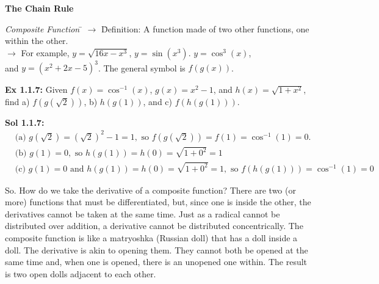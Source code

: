\bigskip

\textbf{\large{The Chain Rule}} \par

\begin{tcolorbox}[definition]
    \begin{tabbing}
        \textit{Composite Function} \= $\rightarrow$ \= Definition: A function made of two other functions, one \\
        \> \> within the other. \\[5.5pt]
        \> $\rightarrow$ \> For example, $y = \sqrt{16x - x^3}$, $y = \sin \left(x^3\right)$. $y = \cos^3 (x)$, \\
        \> \> and $y = \left(x^2 + 2x - 5\right)^3$. The general symbol is $f(g(x))$. 
    \end{tabbing}
\end{tcolorbox} \vspace{11pt}

\begin{tcolorbox}[example]
    \textbf{Ex 1.1.7: } Given $f(x) = \cos^{-1} (x)$, $g(x) = x^2 - 1$, and $h(x) = \sqrt{1 + x^2}$, find a) $f\left(g\left(\sqrt{2}\right)\right)$, b) $h(g(1))$, and c) $f(h(g(1)))$. 
\end{tcolorbox}
\begin{tcolorbox}[solution]
    \textbf{Sol 1.1.7: } \begin{align*}
        &\text{(a) } g\left(\sqrt{2}\right) = \left(\sqrt{2}\right)^2 - 1 = 1, \text{ so } f\left(g\left(\sqrt{2}\right)\right) = f(1) = \cos^{-1}(1) = \boxed{0}. \\[11pt]
        &\text{(b) } g(1) = 0, \text{ so } h(g(1)) = h(0) = \sqrt{1 + 0^2} = \boxed{1} \\[11pt]
        &\text{(c) } g(1) = 0 \text{ and } h(g(1)) = h(0) = \sqrt{1 + 0^2} = 1, \text{ so } f(h(g(1))) = \cos^{-1}(1) = \boxed{0}
    \end{align*}
\end{tcolorbox}

So. How do we take the derivative of a composite function? There are two (or more) functions that must be differentiated, but, since one is inside the other, the derivatives cannot be taken at the same time. Just as a radical cannot be distributed over addition, a derivative cannot be distributed concentrically. The composite function is like a matryoshka (Russian doll) that has a doll inside a doll. The derivative is akin to opening them. They cannot both be opened at the same time and, when one is opened, there is an unopened one within. The result is two open dolls adjacent to each other. 

